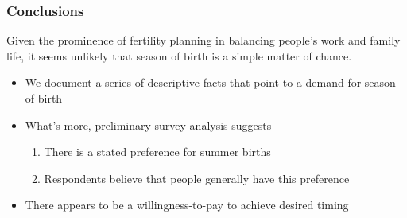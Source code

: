 \documentclass[10pt,letterpaper,subeqn]{beamer}
\begin{document}
\begin{frame}[label=conclusions]
\frametitle{Conclusions}
Given the prominence of fertility planning in balancing people's work and family life, it seems unlikely that season of birth is a simple matter of chance.
\vspace{6mm}
\begin{itemize}
\item We document a series of descriptive facts that point to a demand for season of birth
\item What's more, preliminary survey analysis suggests
  \begin{enumerate}
  \item There is a stated preference for summer births
    \item Respondents believe that people generally have this preference
  \end{enumerate}
\item There appears to be a willingness-to-pay to achieve desired timing
\end{itemize}
\end{frame}

\end{document}
